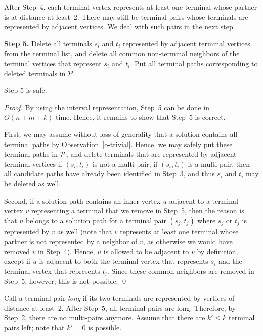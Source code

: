 \documentclass{llncs}
\begin{document}
After Step~4, each terminal vertex represents at least one terminal whose partner is at distance at least~2. There may still be terminal pairs whose terminals are represented by adjacent vertices. We deal with such pairs in the next step.

\medskip
\noindent
{\bf Step 5.}
Delete all terminals $s_i$ and $t_i$ represented by adjacent terminal vertices from the terminal list, and delete all common non-terminal neighbors of the terminal vertices that represent $s_i$ and $t_i$.
Put all terminal paths corresponding to deleted terminals in ${\cal P}$.

\begin{lemma}\label{l-5}
Step 5 is safe.
\end{lemma}

\begin{proof}
By using the interval representation, Step~5 can be done in $O(n+m+k)$ time. Hence, it remains to show that Step~5 is correct.

First, we may assume without loss of generality that a solution contains all terminal paths by Observation~\ref{o-trivial}.
Hence, we may safely put these terminal paths in ${\cal P}$, and delete terminals that are represented by adjacent terminal vertices if $(s_i,t_i)$ is not a multi-pair; if $(s_i,t_i)$ is a multi-pair, then all candidate paths have already been identified in Step~3, and thus $s_i$ and $t_i$ may be deleted as well. 

Second, if a solution path contains an inner vertex $u$ adjacent to a terminal vertex $v$ representing a terminal that we remove in Step~5, then the reason is that $u$ belongs to a solution path for a terminal pair $(s_j,t_j)$ where $s_j$ or $t_j$ is 
represented by $v$ as well (note that $v$ represents at least one terminal whose partner is not represented by a neighbor of $v$, as otherwise we would have removed $v$ in Step~4). Hence, $u$ is allowed to be adjacent to $v$ by definition, except if $u$ is adjacent to both the terminal vertex that represents $s_i$ and the terminal vertex that represents $t_i$. Since these common neighbors are removed in Step~5, however, this is not possible.
\qed
\end{proof}

Call a terminal pair {\it long} if its two terminals are represented by vertices of distance at least~2. 
After Step~5, all terminal pairs are long. Therefore, by Step~2, there are no multi-pairs anymore.
Assume that there are $k'\leq k$ terminal pairs left; note that $k'=0$ is possible.
\end{document}
